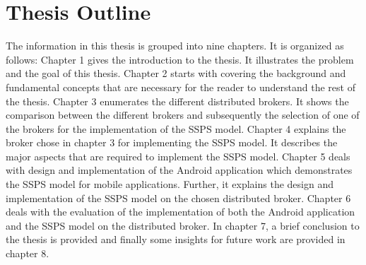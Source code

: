 \section{Thesis Outline}

The information in this thesis is grouped into nine chapters. It is organized as follows: Chapter 1 gives the introduction to the thesis. It illustrates the problem and the goal of this thesis. Chapter 2 starts with covering the background and fundamental concepts that are necessary for the reader to understand the rest of the thesis. Chapter 3 enumerates the different distributed brokers. It shows the comparison between the different brokers and subsequently the selection of one of the brokers for the implementation of the SSPS model. Chapter 4 explains the broker chose in chapter 3 for implementing the SSPS model. It describes the major aspects that are required to implement the SSPS model. Chapter 5 deals with design and implementation of the Android application which demonstrates the SSPS model for mobile applications. Further, it explains the design and implementation of the SSPS model on the chosen distributed broker. Chapter 6 deals with the evaluation of the implementation of both the Android application and the SSPS model on the distributed broker. In chapter 7, a brief conclusion to the thesis is provided and finally some insights for future work are provided in chapter 8.
